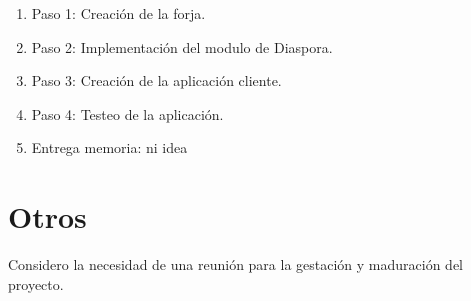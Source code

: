 \documentclass[10pt]{article}
\begin{document}
\begin{enumerate}
  \item Paso 1: Creación de la forja.
  \item Paso 2: Implementación del modulo de Diaspora.
  \item Paso 3: Creación de la aplicación cliente.
  \item Paso 4: Testeo de la aplicación.
  \item Entrega memoria: ni idea
\end{enumerate}

\section{Otros}

Considero la necesidad de una reunión para la gestación y maduración del proyecto.  
\end{document}
